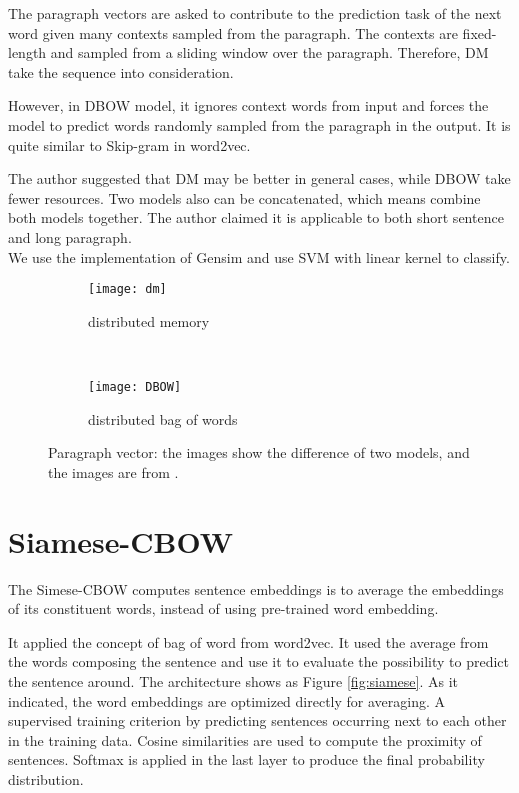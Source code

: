 The paragraph vectors are asked to contribute to the prediction task of the next word given many contexts sampled from the paragraph.
The contexts are fixed-length and sampled from a sliding window over the paragraph. Therefore, DM take the sequence into consideration.

However, in DBOW model, it ignores context words from input and forces the model to predict words randomly sampled from the paragraph in the output.
It is quite similar to Skip-gram in word2vec.

The author suggested that DM may be better in general cases, while DBOW take fewer resources. 
Two models also can be concatenated, which means combine both models together. 
The author claimed it is applicable to both short sentence and long paragraph.\\

We use the implementation of Gensim and use SVM with linear kernel to classify.

\begin{figure}
\centering
\begin{subfigure}{.5\textwidth}
  \centering
  \texttt{[image: dm]}
  \caption{distributed memory}
  \label{fig:dm}
\end{subfigure}~
\begin{subfigure}{.5\textwidth}
  \centering
  \texttt{[image: DBOW]}
  \caption{distributed bag of words}
  \label{fig:dbow}
\end{subfigure}
\caption{Paragraph vector: the images show the difference of two models, and the images are from \cite{PVDM}.}
\label{fig:PVDM}
\end{figure}

\section{Siamese-CBOW}

	The Simese-CBOW\cite{kenter2016siamesecbow} computes sentence embeddings is to average the embeddings of its
constituent words, instead of using pre-trained word embedding. 

It applied the concept of bag of word from word2vec. It used the average from the words composing the sentence and use it to evaluate the possibility to predict the sentence around. 
The architecture shows as Figure \ref{fig:siamese}. As it indicated, the word embeddings are optimized directly for averaging.
A supervised training criterion by predicting sentences occurring next to each other in the training data.
Cosine similarities are used to compute the proximity of sentences.
Softmax is applied in the last layer to produce the final probability distribution.

